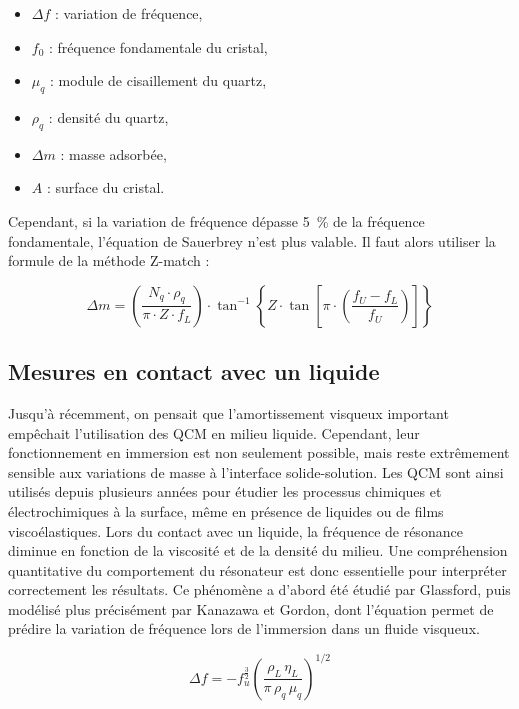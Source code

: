 \begin{itemize}[label=\textbullet]
    \item $\Delta f$ : variation de fréquence,
    \item $f_0$ : fréquence fondamentale du cristal,
    \item $\mu_q$ : module de cisaillement du quartz,
    \item $\rho_q$ : densité du quartz,
    \item $\Delta m$ : masse adsorbée,
    \item $A$ : surface du cristal.
\end{itemize}

Cependant, si la variation de fréquence dépasse 5~\% de la fréquence fondamentale, l’équation de Sauerbrey n’est plus valable.  
Il faut alors utiliser la formule de la méthode Z-match \cite{qcm100manual} :

\begin{equation}
    \Delta m = \left( \frac{N_q \cdot \rho_q}{\pi \cdot Z \cdot f_L} \right) 
    \cdot \tan^{-1} \left\{ Z \cdot \tan \left[ \pi \cdot \left( \frac{f_U - f_L}{f_U} \right) \right] \right\}
\end{equation}

\subsection{Mesures en contact avec un liquide}
Jusqu’à récemment, on pensait que l’amortissement visqueux important empêchait l’utilisation des QCM en milieu liquide. Cependant, leur fonctionnement en immersion est non seulement possible, mais reste extrêmement sensible aux variations de masse à l’interface solide-solution. Les QCM sont ainsi utilisés depuis plusieurs années pour étudier les processus chimiques et électrochimiques à la surface, même en présence de liquides ou de films viscoélastiques. Lors du contact avec un liquide, la fréquence de résonance diminue en fonction de la viscosité et de la densité du milieu. Une compréhension quantitative du comportement du résonateur est donc essentielle pour interpréter correctement les résultats. Ce phénomène a d’abord été étudié par Glassford, puis modélisé plus précisément par Kanazawa et Gordon, dont l’équation permet de prédire la variation de fréquence lors de l’immersion dans un fluide visqueux\cite{qcm100manual}.

\begin{equation}
    \Delta f = -f_u^\frac{3}{2} \left( \frac{\rho_L \, \eta_L}{\pi \, \rho_q \, \mu_q} \right)^{1/2}
    \label{eq:viscosity_frequency_relation}
\end{equation}


